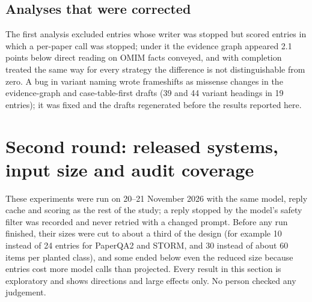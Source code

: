 \documentclass{article} %
\begin{document}
\FloatBarrier
\subsection{Analyses that were corrected}
The first analysis excluded entries whose writer was stopped but scored entries in which a per-paper call was stopped; under it the evidence graph appeared 2.1 points below direct reading on OMIM facts conveyed, and with completion treated the same way for every strategy the difference is not distinguishable from zero. A bug in variant naming wrote frameshifts as missense changes in the evidence-graph and case-table-first drafts (39 and 44 variant headings in 19 entries); it was fixed and the drafts regenerated before the results reported here.
\FloatBarrier
\FloatBarrier
\section{Second round: released systems, input size and audit coverage}
\label{app:round2}
These experiments were run on 20--21 November 2026 with the same model, reply cache and scoring as the rest of the study; a reply stopped by the model's safety filter was recorded and never retried with a changed prompt. Before any run finished, their sizes were cut to about a third of the design (for example 10 instead of 24 entries for PaperQA2 and STORM, and 30 instead of about 60 items per planted class), and some ended below even the reduced size because entries cost more model calls than projected. Every result in this section is exploratory and shows directions and large effects only. No person checked any judgement.

\FloatBarrier
\end{document}
